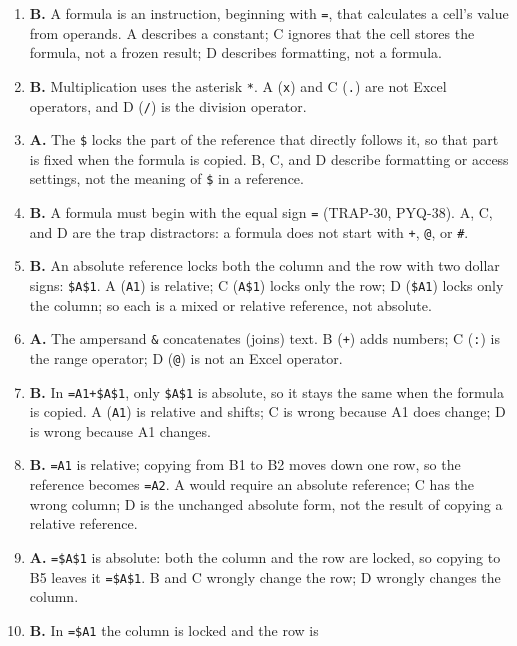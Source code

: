 \begin{enumerate}[label=\textbf{Q\arabic*.}, leftmargin=*]
\item \textbf{B.} A formula is an instruction, beginning with \texttt{=}, that
  calculates a cell's value from operands. A describes a constant; C ignores
  that the cell stores the formula, not a frozen result; D describes
  formatting, not a formula.
\item \textbf{B.} Multiplication uses the asterisk \texttt{*}. A (\texttt{x})
  and C (\texttt{.}) are not Excel operators, and D (\texttt{/}) is the
  division operator.
\item \textbf{A.} The \texttt{\$} locks the part of the reference that
  directly follows it, so that part is fixed when the formula is copied. B, C,
  and D describe formatting or access settings, not the meaning of \texttt{\$}
  in a reference.
\item \textbf{B.} A formula must begin with the equal sign \texttt{=} (TRAP-30,
  PYQ-38). A, C, and D are the trap distractors: a formula does not start with
  \texttt{+}, \texttt{@}, or \texttt{\#}.
\item \textbf{B.} An absolute reference locks both the column and the row with
  two dollar signs: \texttt{\$A\$1}. A (\texttt{A1}) is relative; C
  (\texttt{A\$1}) locks only the row; D (\texttt{\$A1}) locks only the column;
  so each is a mixed or relative reference, not absolute.
\item \textbf{A.} The ampersand \texttt{\&} concatenates (joins) text. B
  (\texttt{+}) adds numbers; C (\texttt{:}) is the range operator; D
  (\texttt{@}) is not an Excel operator.
\item \textbf{B.} In \texttt{=A1+\$A\$1}, only \texttt{\$A\$1} is absolute, so
  it stays the same when the formula is copied. A (\texttt{A1}) is relative
  and shifts; C is wrong because A1 does change; D is wrong because A1 changes.
\item \textbf{B.} \texttt{=A1} is relative; copying from B1 to B2 moves down
  one row, so the reference becomes \texttt{=A2}. A would require an absolute
  reference; C has the wrong column; D is the unchanged absolute form, not the
  result of copying a relative reference.
\item \textbf{A.} \texttt{=\$A\$1} is absolute: both the column and the row
  are locked, so copying to B5 leaves it \texttt{=\$A\$1}. B and C wrongly
  change the row; D wrongly changes the column.
\item \textbf{B.} In \texttt{=\$A1} the column is locked and the row is

\end{enumerate}
